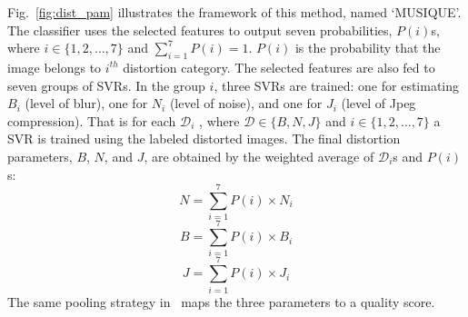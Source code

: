 Fig.~\ref{fig:dist_pam} illustrates the framework of this method, named `MUSIQUE'. The classifier uses the selected features to output seven probabilities, $P(i)$s, where $i\in\{1,2,\ldots, 7\}$ and $\sum_{i=1}^{7}P(i)=1$. $P(i)$ is the probability that the image belongs to $i^{th}$ distortion category. The selected features are also fed to seven groups of SVRs. In the group $i$, three SVRs are trained: one for estimating $B_i$ (level of blur), one for $N_i$ (level of noise), and one for $J_i$ (level of Jpeg compression). That is for each $\mathscr{D}_i$ , where $\mathscr{D}\in \{B, N, J\}$ and $i\in \{1,2,\ldots, 7\}$ a SVR is trained using the labeled distorted images. The final distortion parameters, $B$, $N$, and $J$, are obtained by the weighted average of $\mathscr{D}_i$s and $P(i)$s:
\begin{equation}
    N = \sum_{i=1}^7P(i)\times N_i
\end{equation}
\begin{equation}
    B = \sum_{i=1}^7P(i)\times B_i
\end{equation}
\begin{equation}
    J = \sum_{i=1}^7P(i)\times J_i
\end{equation}
The same pooling strategy in~\cite{Chandler2010} maps the three parameters to a quality score.

